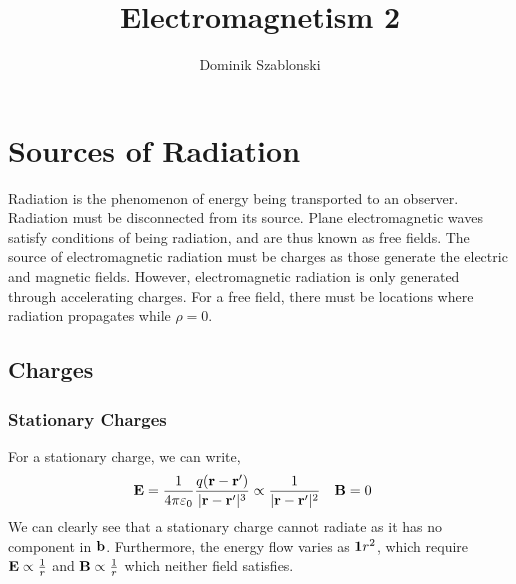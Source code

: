 \documentclass{book}
\title{Electromagnetism 2}
\author{Dominik Szablonski}
\begin{document}
\maketitle

\tableofcontents

\chapter{Sources of Radiation}
Radiation is the phenomenon of energy being transported to an observer. Radiation must be disconnected from its source. Plane electromagnetic waves satisfy conditions of being radiation, and are thus known as free fields. The source of electromagnetic radiation must be charges as those generate the electric and magnetic fields. However, electromagnetic radiation is only generated through accelerating charges. For a free field, there must be locations where radiation propagates while $\rho = 0$.
\section{Charges}
\subsection{Stationary Charges}
For a stationary charge, we can write,
\begin{align}
	\vb{E} = \frac{1}{4\pi\varepsilon_0}\frac{q(\vb{r} - \vb{r}')}{|\vb{r} - \vb{r}'|^3} \propto \frac{1}{|\vb{r} - \vb{r}'|^2} && \vb{B} & = 0
\end{align}
We can clearly see that a stationary charge cannot radiate as it has no component in $\vb{b}$. Furthermore, the energy flow varies as $\vb{1}{r^2}$, which require $\vb{E}\propto\frac{1}{r}$ and $\vb{B}\propto\frac{1}{r}$ which neither field satisfies.
\end{document}

